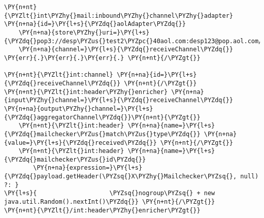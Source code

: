 \begin{Verbatim}[commandchars=\\\{\}]
\PY{n+nt}{\PYZlt{}int\PYZhy{}mail:inbound\PYZhy{}channel\PYZhy{}adapter} \PY{n+na}{id=}\PY{l+s}{\PYZdq{}aolAdapter\PYZdq{}}
    \PY{n+na}{store\PYZhy{}uri=}\PY{l+s}{\PYZdq{}pop3://desp\PYZus{}test2\PYZpc{}40aol.com:desp123@pop.aol.com/INBOX\PYZdq{}}
    \PY{n+na}{channel=}\PY{l+s}{\PYZdq{}receiveChannel\PYZdq{}} \PY{err}{.}\PY{err}{.}\PY{err}{.} \PY{n+nt}{/\PYZgt{}}

\PY{n+nt}{\PYZlt{}int:channel} \PY{n+na}{id=}\PY{l+s}{\PYZdq{}receiveChannel\PYZdq{}} \PY{n+nt}{/\PYZgt{}}
\PY{n+nt}{\PYZlt{}int:header\PYZhy{}enricher} \PY{n+na}{input\PYZhy{}channel=}\PY{l+s}{\PYZdq{}receiveChannel\PYZdq{}} \PY{n+na}{output\PYZhy{}channel=}\PY{l+s}{\PYZdq{}aggregatorChannel\PYZdq{}}\PY{n+nt}{\PYZgt{}}
    \PY{n+nt}{\PYZlt{}int:header} \PY{n+na}{name=}\PY{l+s}{\PYZdq{}mailchecker\PYZus{}match\PYZus{}type\PYZdq{}} \PY{n+na}{value=}\PY{l+s}{\PYZdq{}received\PYZdq{}} \PY{n+nt}{/\PYZgt{}}
    \PY{n+nt}{\PYZlt{}int:header} \PY{n+na}{name=}\PY{l+s}{\PYZdq{}mailchecker\PYZus{}id\PYZdq{}} 
        \PY{n+na}{expression=}\PY{l+s}{\PYZdq{}payload.getHeader(\PYZsq{}X\PYZhy{}Mailchecker\PYZsq{}, null) ?: }
\PY{l+s}{                    \PYZsq{}nogroup\PYZsq{} + new java.util.Random().nextInt()\PYZdq{}} \PY{n+nt}{/\PYZgt{}}
\PY{n+nt}{\PYZlt{}/int:header\PYZhy{}enricher\PYZgt{}}
\end{Verbatim}
